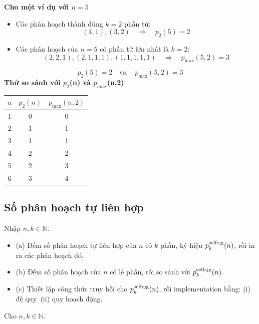 \documentclass{article}
\begin{document}
	\textbf{Cho một ví dụ với $n=5$}
	
	\begin{itemize}
		\item Các phân hoạch thành đúng $k=2$ phần tử:
		\[
		(4,1), (3,2)
		\quad\Rightarrow\quad p_2(5) = 2
		\]
		\item Các phân hoạch của $n=5$ có phần tử lớn nhất là $k=2$:
		\[
		(2,2,1), (2,1,1,1), (1,1,1,1,1)
		\quad\Rightarrow\quad p_{\max}(5,2) = 3
		\]
	\end{itemize}
	
	\[
	p_2(5) = 2 \quad\text{vs.}\quad p_{\max}(5,2) = 3
	\]
	\newpage
	\textbf{Thử so sánh với $p_2$(n) và $p_{max}$(n,2)}
	\begin{center}
		\begin{tabular}{@{}ccc@{}}
			\toprule
			$n$ & $p_2(n)$ & $p_{\max}(n,2)$ \\
			\midrule
			1 & 0 & 0 \\
			2 & 1 & 1 \\
			3 & 1 & 1 \\
			4 & 2 & 2 \\
			5 & 2 & 3 \\
			6 & 3 & 4 \\
			\bottomrule
		\end{tabular}
	\end{center}
	
	\subsection*{Số phân hoạch tự liên hợp}
	 Nhập $n,k\in\mathbb{N}$. 
	 \begin{itemize}
	 	\item (a) Đếm số phân hoạch tự liên hợp của $n$ có $k$ phần, ký hiệu $p_k^{\rm selfcjg}(n)$, rồi in ra các phân hoạch đó.
	 	\item (b) Đếm số phân hoạch của $n$ có lẻ phần, rồi so sánh với $p_k^{\rm selfcjg}(n)$.
	 	\item (c) Thiết lập công thức truy hồi cho $p_k^{\rm selfcjg}(n)$, rồi implementation bằng: (i) đệ quy. (ii) quy hoạch động.
	 \end{itemize}
	   
	Cho $n,k\in\mathbb{N}$.
	
\end{document}
